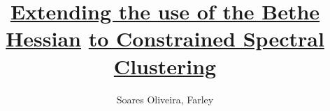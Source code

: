 

% 
\documentclass[a4paper,11pt]{jreport}

\usepackage[dvipdfmx]{graphicx}  
\usepackage{amsmath}
\usepackage{amsfonts}
\usepackage{varioref}
\usepackage[shortlabels]{enumitem}



\DeclareMathOperator{\cut}{cut\,}
\DeclareMathOperator{\ii}{I\,}
\DeclareMathOperator{\h}{H\,}
\DeclareMathOperator{\nmi}{NMI\,}
\DeclareMathOperator{\spn}{span\,}
\DeclareMathOperator*{\vol}{vol\,}
\DeclareMathOperator*{\ncut}{Ncut\,}
\DeclareMathOperator*{\argmin}{\arg\!\min}



\usepackage[left=25truemm,top=35truemm,right=25truemm,bottom=50truemm]{geometry}
\usepackage{times} %

\setcounter{tocdepth}{3}
\setcounter{page}{-1}

\setlength{\parskip}{0em}
\setlength{\topsep}{0em}


\usepackage{coins-jp-utf8}

\title{\underline{Extending the use of the Bethe Hessian} \underline{to Constrained Spectral Clustering}}
\author{Soares Oliveira, Farley}

